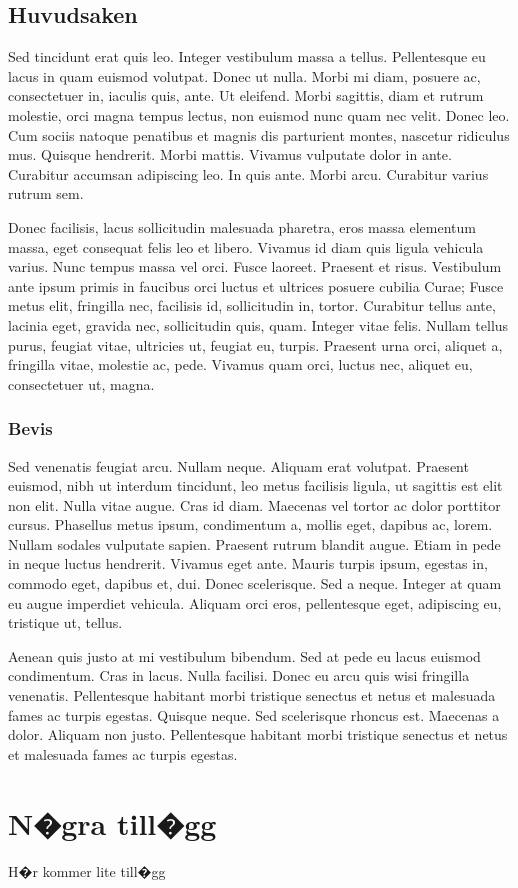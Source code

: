\documentclass[a4paper,11pt]{kth-mag}
\begin{document}
\section{Huvudsaken}

Sed tincidunt erat quis leo. Integer vestibulum massa a tellus.
Pellentesque eu lacus in quam euismod volutpat. Donec ut nulla. Morbi
mi diam, posuere ac, consectetuer in, iaculis quis, ante. Ut eleifend.
Morbi sagittis, diam et rutrum molestie, orci magna tempus lectus, non
euismod nunc quam nec velit. Donec leo. Cum sociis natoque penatibus
et magnis dis parturient montes, nascetur ridiculus mus. Quisque
hendrerit. Morbi mattis. Vivamus vulputate dolor in ante. Curabitur
accumsan adipiscing leo. In quis ante. Morbi arcu. Curabitur varius
rutrum sem.

Donec facilisis, lacus sollicitudin malesuada pharetra, eros massa
elementum massa, eget consequat felis leo et libero. Vivamus id diam
quis ligula vehicula varius. Nunc tempus massa vel orci. Fusce
laoreet. Praesent et risus. Vestibulum ante ipsum primis in faucibus
orci luctus et ultrices posuere cubilia Curae; Fusce metus elit,
fringilla nec, facilisis id, sollicitudin in, tortor. Curabitur tellus
ante, lacinia eget, gravida nec, sollicitudin quis, quam. Integer
vitae felis. Nullam tellus purus, feugiat vitae, ultricies ut, feugiat
eu, turpis. Praesent urna orci, aliquet a, fringilla vitae, molestie
ac, pede. Vivamus quam orci, luctus nec, aliquet eu, consectetuer ut,
magna.

\subsection{Bevis}

Sed venenatis feugiat arcu. Nullam neque. Aliquam erat volutpat.
Praesent euismod, nibh ut interdum tincidunt, leo metus facilisis
ligula, ut sagittis est elit non elit. Nulla vitae augue. Cras id
diam. Maecenas vel tortor ac dolor porttitor cursus. Phasellus metus
ipsum, condimentum a, mollis eget, dapibus ac, lorem. Nullam sodales
vulputate sapien. Praesent rutrum blandit augue. Etiam in pede in
neque luctus hendrerit. Vivamus eget ante. Mauris turpis ipsum,
egestas in, commodo eget, dapibus et, dui. Donec scelerisque. Sed a
neque. Integer at quam eu augue imperdiet vehicula. Aliquam orci eros,
pellentesque eget, adipiscing eu, tristique ut, tellus.

Aenean quis justo at mi vestibulum bibendum. Sed at pede eu lacus
euismod condimentum. Cras in lacus. Nulla facilisi. Donec eu arcu quis
wisi fringilla venenatis. Pellentesque habitant morbi tristique
senectus et netus et malesuada fames ac turpis egestas. Quisque neque.
Sed scelerisque rhoncus est. Maecenas a dolor. Aliquam non justo.
Pellentesque habitant morbi tristique senectus et netus et malesuada
fames ac turpis egestas.

\appendix
\addappheadtotoc
\chapter{N�gra till�gg}
H�r kommer lite till�gg
\end{document}
